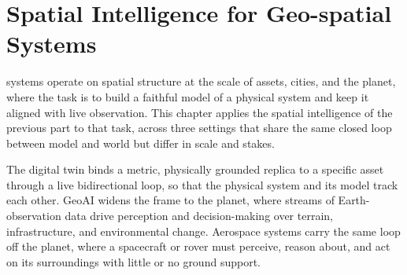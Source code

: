 \chapter{Spatial Intelligence for Geo-spatial Systems }


 systems operate on spatial structure at the scale of assets, cities, and the planet, where the task is to build a faithful model of a physical system and keep it aligned with live observation. This chapter applies the spatial intelligence of the previous part to that task, across three settings that share the same closed loop between model and world but differ in scale and stakes.

The digital twin binds a metric, physically grounded replica to a specific asset through a live bidirectional loop, so that the physical system and its model track each other. GeoAI widens the frame to the planet, where streams of Earth-observation data drive perception and decision-making over terrain, infrastructure, and environmental change. Aerospace systems carry the same loop off the planet, where a spacecraft or rover must perceive, reason about, and act on its surroundings with little or no ground support.



\newpage

\newpage
